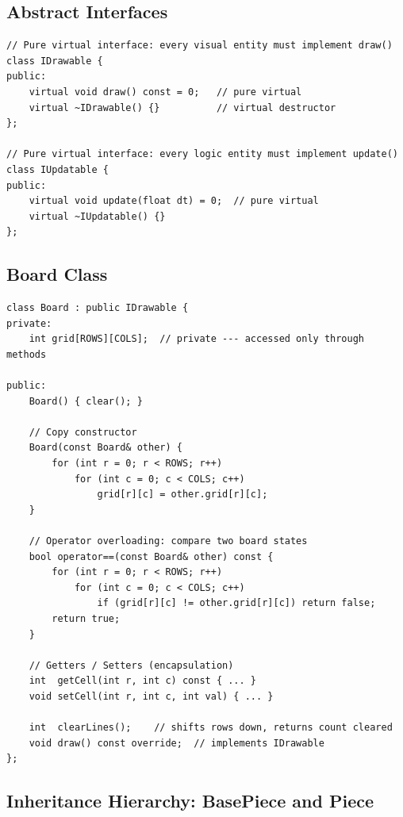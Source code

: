 \documentclass[11pt]{article}
\begin{document}
\subsection{Abstract Interfaces}

\begin{lstlisting}[caption={IDrawable and IUpdatable --- abstract base classes}]
// Pure virtual interface: every visual entity must implement draw()
class IDrawable {
public:
    virtual void draw() const = 0;   // pure virtual
    virtual ~IDrawable() {}          // virtual destructor
};

// Pure virtual interface: every logic entity must implement update()
class IUpdatable {
public:
    virtual void update(float dt) = 0;  // pure virtual
    virtual ~IUpdatable() {}
};
\end{lstlisting}

\subsection{Board Class}

\begin{lstlisting}[caption={Board --- encapsulation, copy constructor, operator==, IDrawable}]
class Board : public IDrawable {
private:
    int grid[ROWS][COLS];  // private --- accessed only through methods

public:
    Board() { clear(); }

    // Copy constructor
    Board(const Board& other) {
        for (int r = 0; r < ROWS; r++)
            for (int c = 0; c < COLS; c++)
                grid[r][c] = other.grid[r][c];
    }

    // Operator overloading: compare two board states
    bool operator==(const Board& other) const {
        for (int r = 0; r < ROWS; r++)
            for (int c = 0; c < COLS; c++)
                if (grid[r][c] != other.grid[r][c]) return false;
        return true;
    }

    // Getters / Setters (encapsulation)
    int  getCell(int r, int c) const { ... }
    void setCell(int r, int c, int val) { ... }

    int  clearLines();    // shifts rows down, returns count cleared
    void draw() const override;  // implements IDrawable
};
\end{lstlisting}

\subsection{Inheritance Hierarchy: BasePiece and Piece}
\end{document}
